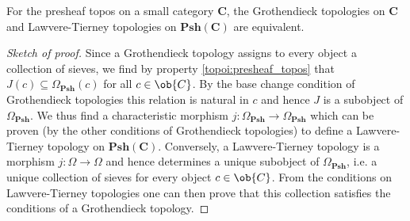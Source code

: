     \begin{property}
        For the presheaf topos on a small category $\mathbf{C}$, the Grothendieck topologies on $\mathbf{C}$ and Lawvere-Tierney topologies on $\mathbf{Psh}(\mathbf{C})$ are equivalent.
        \begin{proof}[Sketch of proof]
            Since a Grothendieck topology assigns to every object a collection of sieves, we find by property \ref{topoi:presheaf_topos} that $J(c)\subseteq\Omega_{\mathbf{Psh}}(c)$ for all $c\in\ob{C}$. By the base change condition of Grothendieck topologies this relation is natural in $c$ and hence $J$ is a subobject of $\Omega_{\mathbf{Psh}}$. We thus find a characteristic morphism $j:\Omega_{\mathbf{Psh}}\rightarrow\Omega_{\mathbf{Psh}}$ which can be proven (by the other conditions of Grothendieck topologies) to define a Lawvere-Tierney topology on $\mathbf{Psh}(\mathbf{C})$. Conversely, a Lawvere-Tierney topology is a morphism $j:\Omega\rightarrow\Omega$ and hence determines a unique subobject of $\Omega_{\mathbf{Psh}}$, i.e. a unique collection of sieves for every object $c\in\ob{C}$. From the conditions on Lawvere-Tierney topologies one can then prove that this collection satisfies the conditions of a Grothendieck topology.
        \end{proof}
    \end{property}
